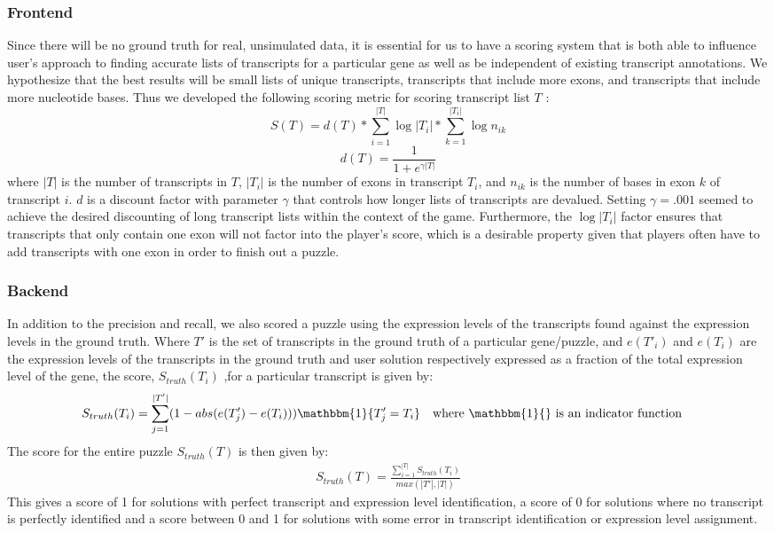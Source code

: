 \documentclass[12pt]{article}
\begin{document}
\subsubsection*{Frontend}
Since there will be no ground truth for real, unsimulated data, it is essential for us to have
a scoring system that is both able to influence user's approach to finding accurate lists of transcripts for a particular gene as well as be independent of existing transcript annotations. We hypothesize that the best results will be small lists of unique transcripts, transcripts that include more exons, and transcripts that include more nucleotide bases.
Thus we developed the following scoring metric for scoring transcript list $T$ :
\begin{equation*}
S(T) = d(T) * \sum_{i=1}^{|T|} \log{|T_i|} * \sum_{k = 1}^{|T_i|} \log{n_{ik}}
\end{equation*}
\begin{equation*}
d(T) = \frac{1}{1+e^{\gamma |T|}}
\end{equation*}
where $|T|$ is the number of transcripts in $T$, $|T_i|$ is the number of exons in transcript $T_i$, and $n_{ik}$ is the number of bases in exon $k$ of transcript $i$.
$d$ is a discount factor with parameter $\gamma$ that controls how longer lists of transcripts are devalued. Setting $\gamma = .001$ seemed to achieve the desired
discounting of long transcript lists within the context of the game. Furthermore, the $\log{|T_i|}$ factor ensures that transcripts that only contain one exon will not factor
into the player's score, which is a desirable property given that players often have to add transcripts with one exon in order to finish out a puzzle.
\subsubsection*{Backend}
In addition to the precision and recall, we also scored a puzzle using the expression levels of the transcripts found against the expression levels in the ground truth. Where $T'$ is the set of transcripts in the ground truth of a particular gene/puzzle, and $e(T'_i)$ and $e(T_i)$ are the expression levels of the transcripts in the ground truth and user solution respectively expressed as a fraction of the total expression level of the gene, the score, $S_{truth}(T_i)$ ,for a particular transcript is given by:
\begin{align*}
S_{truth}(T_i) &= \sum\limits_{j = 1}^{|T'|}(1 - abs(e(T'_j) - e(T_i)))\mathbbm{1}\{T'_j = T_i\} \quad \text{where $\mathbbm{1}\{\}$ is an indicator function}
\end{align*}
The score for the entire puzzle $S_{truth}(T)$ is then given by:
\begin{align*}
S_{truth}(T) = \frac{\sum\limits_{i=1}^{|T|} S_{truth}(T_i)}{max(|T'|, |T|)}
\end{align*}
This gives a score of 1 for solutions with perfect transcript and expression level identification, a score of 0 for solutions where no transcript is perfectly identified and a score between 0 and 1 for solutions with some error in transcript identification or expression level assignment.
\end{document}
